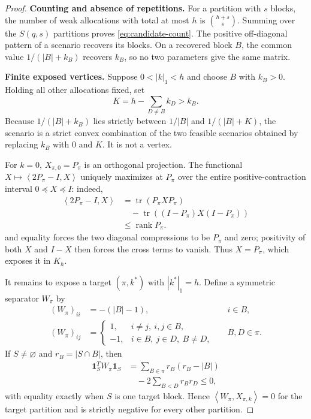 \documentclass[journal,10pt]{IEEEtran}
\theoremstyle{definition}
\theoremstyle{remark}
\newcommand{\one}{\mathbf 1}
\newcommand{\tr}{\operatorname{tr}}
\newcommand{\rank}{\operatorname{rank}}
\newcommand{\ip}[2]{\left\langle #1,#2\right\rangle}
\begin{document}
\begin{proof}
\textbf{Counting and absence of repetitions.}
For a partition with $s$ blocks, the number of weak allocations with total at
most $h$ is $\binom{h+s}{s}$.  Summing over the $S(q,s)$ partitions proves
\eqref{eq:candidate-count}.  The positive off-diagonal pattern of a scenario
recovers its blocks.  On a recovered block $B$, the common value
$1/(|B|+k_B)$ recovers $k_B$, so no two parameters give the same matrix.

\textbf{Finite exposed vertices.}
Suppose $0<|k|_1<h$ and choose $B$ with $k_B>0$.  Holding all other
allocations fixed, set
\[
  K=h-\sum_{D\neq B}k_D>k_B.
\]
Because $1/(|B|+k_B)$ lies strictly between $1/|B|$ and
$1/(|B|+K)$, the scenario is a strict convex combination of the two feasible
scenarios obtained by replacing $k_B$ with $0$ and $K$.  It is not a vertex.

For $k=0$, $X_{\pi,0}=P_\pi$ is an orthogonal projection.  The functional
$X\mapsto\ip{2P_\pi-I}{X}$ uniquely maximizes at $P_\pi$ over the entire
positive-contraction interval $0\preceq X\preceq I$: indeed,
\begin{equation}
\begin{aligned}
 \ip{2P_\pi-I}{X}
 &=\tr(P_\pi XP_\pi)\\
 &\quad-\tr((I-P_\pi)X(I-P_\pi))\\
 &\leq\rank P_\pi.
\end{aligned}
\end{equation}
and equality forces the two diagonal compressions to be $P_\pi$ and zero;
positivity of both $X$ and $I-X$ then forces the cross terms to vanish.  Thus
$X=P_\pi$, which exposes it in $K_h$.

It remains to expose a target $(\pi,k^*)$ with $|k^*|_1=h$.  Define a symmetric
separator $W_\pi$ by
\[
\begin{aligned}
 (W_\pi)_{ii}&=-(|B|-1), &&i\in B,\\
 (W_\pi)_{ij}&=
 \begin{cases}
  1, &i\ne j,\ i,j\in B,\\
  -1,&i\in B,\ j\in D,\ B\ne D,
 \end{cases}
 &&B,D\in\pi.
\end{aligned}
\]
If $S\neq\varnothing$ and $r_B=|S\cap B|$, then
\begin{equation}
\begin{aligned}
 \one_S^TW_\pi\one_S
 &=\sum_{B\in\pi}r_B(r_B-|B|)\\
 &\quad-2\sum_{B<D}r_Br_D\leq0,
\end{aligned}
  \label{eq:partition-separator}
\end{equation}
with equality exactly when $S$ is one target block.  Hence
$\ip{W_\pi}{X_{\pi,k}}=0$ for the target partition and is strictly negative
for every other partition.


\end{proof}
\end{document}
